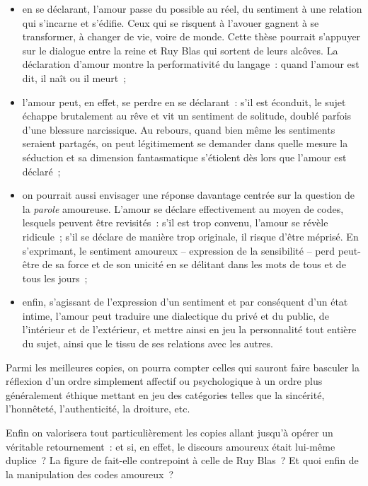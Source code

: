 {\begin{itemize}
\item en se déclarant, l'amour passe du possible au réel, du sentiment à une relation
qui s'incarne et s'édifie. Ceux qui se risquent à l'avouer gagnent à se
transformer, à changer de vie, voire de monde. Cette thèse pourrait s'appuyer
sur le dialogue entre la reine et Ruy Blas qui sortent de leurs alcôves. La
déclaration d'amour montre la performativité du langage~: quand l'amour est dit,
il naît ou il meurt~;
\item l'amour peut, en effet, se perdre en se déclarant~: s'il est éconduit, le sujet
échappe brutalement au rêve et vit un sentiment de solitude, doublé parfois
d'une blessure narcissique. Au rebours, quand bien même les sentiments
seraient partagés, on peut légitimement se demander dans quelle mesure la
séduction et sa dimension fantasmatique s'étiolent dès lors que l'amour est
déclaré~;
\item on pourrait aussi envisager une réponse davantage centrée sur la question de
la \textit{parole} amoureuse. L'amour se déclare effectivement au moyen de codes,
lesquels peuvent être revisités~: s'il est trop convenu, l'amour se révèle ridicule~;
s'il se déclare de manière trop originale, il risque d'être méprisé. En s'exprimant,
le sentiment amoureux – expression de la sensibilité – perd peut-être de sa
force et de son unicité en se délitant dans les mots de tous et de tous les jours~;
\item enfin, s'agissant de l'expression d'un sentiment et par conséquent d'un état
intime, l'amour peut traduire une dialectique du privé et du public, de l'intérieur
et de l'extérieur, et mettre ainsi en jeu la personnalité tout entière du sujet, ainsi
que le tissu de ses relations avec les autres.
\end{itemize}

Parmi les meilleures copies, on pourra compter celles qui sauront faire basculer la
réflexion d'un ordre simplement affectif ou psychologique à un ordre plus
généralement éthique mettant en jeu des catégories telles que la sincérité, l'honnêteté,
l'authenticité, la droiture, etc.

Enfin on valorisera tout particulièrement les copies allant jusqu'à opérer un véritable
retournement~: et si, en effet, le discours amoureux était lui-même duplice~? La figure
de  fait-elle contrepoint à celle de Ruy Blas~? Et quoi enfin de la manipulation
des codes amoureux~?}
\vfill{~}\clearpage
